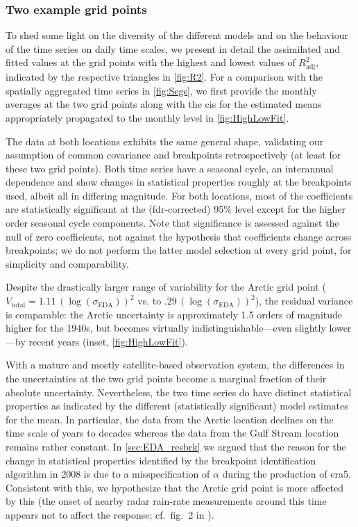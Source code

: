 \subsubsection{Two example grid points}

To shed some light on the diversity of the different models and on the behaviour of the time series on daily time scales, we present in detail the assimilated and fitted values at the grid points with the highest and lowest values of $R^2_{\mathrm{adj}}$, indicated by the respective triangles in \cref{fig:R2}. For a comparison with the spatially aggregated time series in \cref{fig:Segs}, we first provide the monthly averages at the two grid points along with the \glspl{ci} for the estimated means appropriately propagated to the monthly level in \cref{fig:HighLowFit}.

The data at both locations exhibits the same general shape, validating our assumption of common covariance and breakpoints retrospectively (at least for these two grid points). Both time series have a seasonal cycle, an interannual dependence and show changes in statistical properties roughly at the breakpoints used, albeit all in differing magnitude.  For both locations, most of the coefficients are statistically significant at the (\gls{fdr}-corrected) 95\% level except for the higher order seasonal cycle components. Note that significance is assessed against the null of zero coefficients, not against the hypothesis that coefficients change across breakpoints; we do not perform the latter model selection at every grid point, for simplicity and comparability.

Despite the drastically larger range of variability for the Arctic grid point ($V_{\mathrm{total}} = 1.11\, (\log(\sigma_{\mathrm{EDA}}))^2$ vs. to $.29\, (\log(\sigma_{\mathrm{EDA}}))^2$), the residual variance is comparable: the Arctic uncertainty is approximately 1.5 orders of magnitude higher for the 1940s, but becomes virtually indistinguishable---even slightly lower---by recent years (inset, \cref{fig:HighLowFit}).

With a mature and mostly satellite-based observation system, the differences in the uncertainties at the two grid points become a marginal fraction of their absolute uncertainty. Nevertheless, the two time series do have distinct statistical properties as indicated by the different (statistically significant) model estimates for the mean. In particular, the data from the Arctic location declines on the time scale of years to decades whereas the data from the Gulf Stream location remains rather constant. In \cref{sec:EDA_resbrk} we argued that the reason for the change in statistical properties identified by the breakpoint identification algorithm in 2008 is due to a misspecification of $\alpha$ during the production of \gls{era5}. Consistent with this, we hypothesize that the Arctic grid point is more affected by this (the onset of nearby radar rain-rate measurements around this time appears not to affect the response; cf.~fig.~2 in \textcite{sociERA5GlobalReanalysis2024}).

